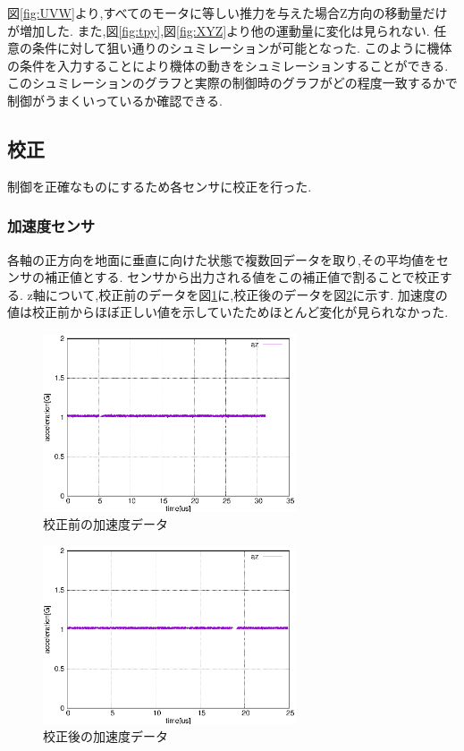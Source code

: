 \documentclass[12pt,oneside]{sotsuken_paper}
\begin{document}
図\ref{fig:UVW}より,すべてのモータに等しい推力を与えた場合Z方向の移動量だけが増加した.
また,図\ref{fig:tpy},図\ref{fig:XYZ}より他の運動量に変化は見られない.
任意の条件に対して狙い通りのシュミレーションが可能となった.
このように機体の条件を入力することにより機体の動きをシュミレーションすることができる.
このシュミレーションのグラフと実際の制御時のグラフがどの程度一致するかで制御がうまくいっているか確認できる.

\subsection{校正}
制御を正確なものにするため各センサに校正を行った.

\subsubsection{加速度センサ}
各軸の正方向を地面に垂直に向けた状態で複数回データを取り,その平均値をセンサの補正値とする.
センサから出力される値をこの補正値で割ることで校正する.
z軸について,校正前のデータを図\ref{fig:acc-calib-be}に,校正後のデータを図\ref{fig:acc-calib-af}に示す.
加速度の値は校正前からほぼ正しい値を示していたためほとんど変化が見られなかった.

\begin{figure}[htbp]
	\begin{center}
		\includegraphics[width=75mm]{image/calibration/acc-calib-be.eps}
		\caption{校正前の加速度データ}
		\label{fig:acc-calib-be}
	\end{center}
\end{figure}

\begin{figure}[htbp]
	\begin{center}
		\includegraphics[width=75mm]{image/calibration/acc-calib-af.eps}
		\caption{校正後の加速度データ}
		\label{fig:acc-calib-af}
	\end{center}
\end{figure}
\end{document}
